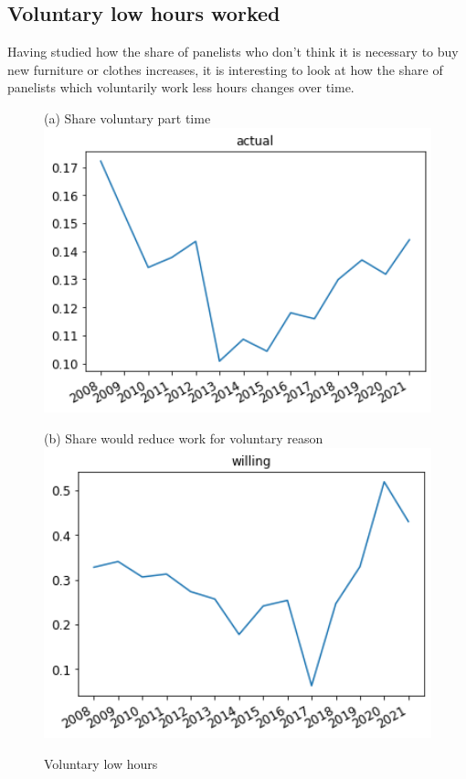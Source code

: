\documentclass[12pt]{article}
\begin{document}
\subsection{Voluntary low hours worked}
Having studied how the share of panelists who don't think it is necessary to buy new furniture or clothes increases, it is interesting to look at how the share of panelists which voluntarily work less hours changes over time. 


\begin{figure}[h!!]
	\centering	
	\caption{Voluntary low hours }\label{fig:evolution_wtr}	
	\begin{minipage}[h!!]{0.32\textwidth}  
		\centering\footnotesize{(a) Share voluntary part time}
		\includegraphics[width=1\textwidth]{../codding_data/results/liss/total_share_voluntary_work_reduction_actual.png}
	\end{minipage}
	\begin{minipage}[h!!]{0.32\textwidth}
		\centering\footnotesize{(b) Share would reduce work for voluntary reason}
		\includegraphics[width=1\textwidth]{../codding_data/results/liss/total_share_voluntary_work_reduction_willing.png}
	\end{minipage}
\end{figure}
\end{document}
